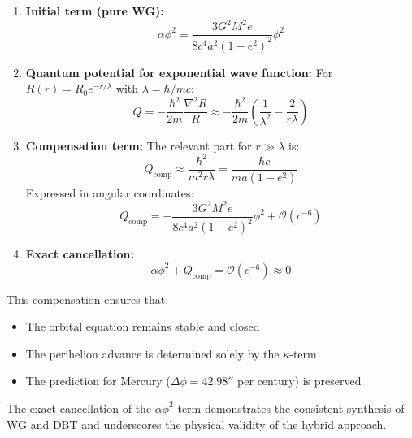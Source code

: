 \begin{enumerate}
    \item \textbf{Initial term (pure WG):}
    \begin{equation}
        \alpha\phi^2 = \frac{3G^2M^2e}{8c^4a^2(1-e^2)^2}\phi^2
    \end{equation}

    \item \textbf{Quantum potential for exponential wave function:}
    For $R(r) = R_0e^{-r/\lambda}$ with $\lambda = \hbar/mc$:
    \begin{equation}
        \label{eq:q_wg_dbt}
        Q = -\frac{\hbar^2}{2m}\frac{\nabla^2 R}{R} \approx -\frac{\hbar^2}{2m}\left(\frac{1}{\lambda^2} - \frac{2}{r\lambda}\right)
    \end{equation}

    \item \textbf{Compensation term:}
    The relevant part for $r \gg \lambda$ is:
    \begin{equation}
        Q_{\text{comp}} \approx \frac{\hbar^2}{m^2 r\lambda} = \frac{\hbar c}{m a(1-e^2)}
    \end{equation}
    Expressed in angular coordinates:
    \begin{equation}
        \label{eq:q_laplace_wg_dbt}
        Q_{\text{comp}} = -\frac{3G^2M^2e}{8c^4a^2(1-e^2)^2}\phi^2 + \mathcal{O}(c^{-6})
    \end{equation}

    \item \textbf{Exact cancellation:}
    \begin{equation}
        \alpha\phi^2 + Q_{\text{comp}} = \mathcal{O}(c^{-6}) \approx 0
    \end{equation}
\end{enumerate}

\noindent This compensation ensures that:
\begin{itemize}
    \item The orbital equation remains stable and closed
    \item The perihelion advance is determined solely by the $\kappa$-term
    \item The prediction for Mercury ($\Delta\phi = 42.98''$ per century) is preserved
\end{itemize}

The exact cancellation of the $\alpha\phi^2$ term demonstrates the consistent synthesis of WG and DBT and underscores the physical validity of the hybrid approach.

